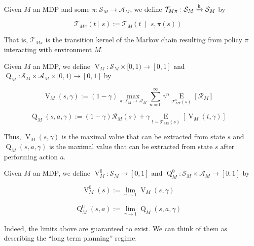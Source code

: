\documentclass[anon,12pt]{colt2018} %
\newcommand{\AB}[1]{\left[#1\right]}
\newcommand{\APM}[2]{\left(#1\;\middle\vert\;#2\right)}
\newcommand{\Ea}[2]{\underset{#1}{\operatorname{E}}\AB{#2}}
\newcommand{\K}{\xrightarrow{\textnormal{k}}}
\newcommand{\A}{\mathcal{A}}
\newcommand{\St}{\mathcal{S}}
\newcommand{\T}{\mathcal{T}}
\newcommand{\R}{\mathcal{R}}
\newcommand{\V}{\operatorname{V}}
\newcommand{\Q}{\operatorname{Q}}
\begin{document}
\begin{samepage}
\begin{definition}

Given $M$ an MDP and some $\pi: \St_M \rightarrow \A_M$, we define $\T_{M\pi}: \St_M \K \St_M$ by

\begin{equation}
\T_{M\pi}(t \mid s) := \T_M\APM{t}{s,\pi(s)}
\end{equation}

That is, $\T_{M\pi}$ is the transition kernel of the Markov chain resulting from policy $\pi$ interacting with environment $M$.

\end{definition}
\end{samepage}

\begin{samepage}
\begin{definition}

Given $M$ an MDP, we define $\V_M : \St_M \times [0,1) \rightarrow [0,1]$ and $\Q_M: \St_M \times \A_M \times [0,1) \rightarrow [0,1]$ by

\begin{equation}
\V_M(s,\gamma):=(1-\gamma) \max_{\pi: \St_M \rightarrow \A_M} \sum_{n=0}^\infty \gamma^n \Ea{\T_{M\pi}^n(s)}{\R_M}
\end{equation}

\begin{equation}
\Q_M(s,a,\gamma):=(1-\gamma)\R_M(s)+\gamma\Ea{t \sim \T_{M\pi}(s)}{\V_M(t,\gamma)}
\end{equation}

Thus, $\V_M(s,\gamma)$ is the maximal value that can be extracted from state $s$ and $\Q_M(s,a,\gamma)$ is the maximal value that can be extracted from state $s$ after performing action $a$.

\end{definition}
\end{samepage}

\begin{samepage}
\begin{definition}

Given $M$ an MDP, we define $\V^0_M : \St_M \rightarrow [0,1]$ and $\Q^0_M: \St_M \times \A_M \rightarrow [0,1]$ by

\begin{equation}
\V_M^0(s) := \lim_{\gamma \rightarrow 1} \V_M(s,\gamma)
\end{equation}

\begin{equation}
\Q_M^0(s,a) := \lim_{\gamma \rightarrow 1} \Q_M(s,a,\gamma)
\end{equation}

Indeed, the limits above are guaranteed to exist. We can think of them as describing the \enquote{long term planning} regime.

\end{definition}
\end{samepage}
\end{document}
